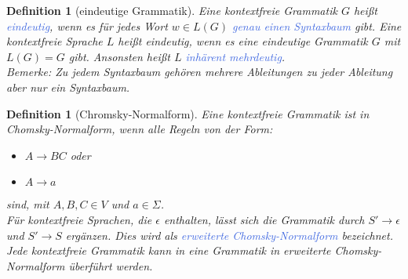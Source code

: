 \documentclass[11pt]{scrartcl}
\newcommand{\tcol}[1]{\textcolor{RoyalBlue}{#1}}
\theoremstyle{break}
\newtheorem{defi}[satz]{Definition}
\begin{document}
    \begin{defi}[eindeutige Grammatik]
        Eine kontextfreie Grammatik $G$ heißt \tcol{eindeutig}, wenn es für jedes Wort $w\in L(G)$ \tcol{genau einen Syntaxbaum} gibt.
        Eine kontextfreie Sprache $L$ heißt eindeutig, wenn es eine eindeutige Grammatik $G$ mit $L(G)=G$ gibt.
        Ansonsten heißt $L$ \tcol{inhärent mehrdeutig}.\\
        Bemerke: Zu jedem Syntaxbaum gehören mehrere Ableitungen zu jeder Ableitung aber nur ein Syntaxbaum.
    \end{defi}

    \begin{defi}[Chromsky-Normalform]
        Eine kontextfreie Grammatik ist in Chomsky-Normalform, wenn alle Regeln von der Form:
        \begin{itemize}
            \item $A\rightarrow BC$ oder
            \item $A\rightarrow a$
        \end{itemize}
        sind, mit $A,B,C\in V$ und $a\in\Sigma$.\\
        Für kontextfreie Sprachen, die $\epsilon$ enthalten, lässt sich die Grammatik durch $S'\rightarrow\epsilon$ und $S'\rightarrow S$ ergänzen.
        Dies wird als \tcol{erweiterte Chomsky-Normalform} bezeichnet.\\
        Jede kontextfreie Grammatik kann in eine Grammatik in erweiterte Chomsky-Normalform überführt werden.
    \end{defi}
\end{document}
